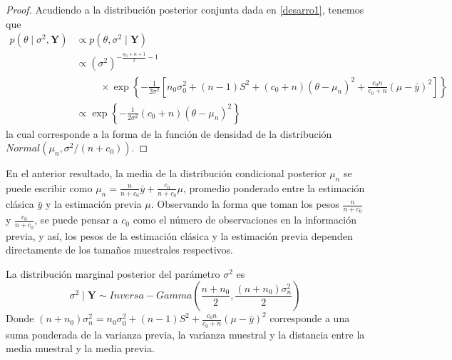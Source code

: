 \begin{proof}
Acudiendo a la distribución posterior conjunta dada en \ref{desarro1}, tenemos que
\begin{align*}
p(\theta \mid \sigma^2,\mathbf{Y})&\propto 
p(\theta,\sigma^2 \mid \mathbf{Y}) \\
&\propto(\sigma^2)^{-\frac{n_0+n+1}{2}-1}\\
&\hspace{1cm}\times
\exp\left\{-\frac{1}{2\sigma^2}\left[n_0\sigma^2_0+(n-1)S^2+(c_0+n)(\theta-\mu_n)^2+\frac{c_0n}{c_0+n}(\mu-\bar{y})^2\right]\right\}\\
&\propto \exp\left\{-\frac{1}{2\sigma^2}(c_0+n)(\theta-\mu_n)^2\right\}
\end{align*}
la cual corresponde a la forma de la función de densidad de la distribución $Normal(\mu_n, \sigma^2/(n+c_0))$.
\end{proof}

En el anterior resultado, la media de la distribución condicional posterior $\mu_n$ se puede escribir como $\mu_n=\frac{n}{n+c_0}\bar{y}+\frac{c_0}{n+c_0}\mu$, promedio ponderado entre la estimación clásica $\bar{y}$ y la estimación previa $\mu$. Observando la forma que toman los pesos $\frac{n}{n+c_0}$ y $\frac{c_0}{n+c_0}$, se puede pensar a $c_0$ como el número de observaciones en la información previa, y así, los pesos de la estimación clásica y la estimación previa dependen directamente de los tamaños muestrales respectivos.

\begin{Res}\label{Poster_sigma2_IG}
La distribución marginal posterior del parámetro $\sigma^2$ es
\begin{equation*}
\sigma^2 \mid \mathbf{Y} \sim Inversa-Gamma\left(\frac{n+n_0}{2},\frac{(n+n_0)\sigma^2_n}{2}\right)
\end{equation*}
Donde $(n+n_0)\sigma^2_n=n_0\sigma^2_0+(n-1)S^2+\frac{c_0n}{c_0+n}(\mu-\bar{y})^2$ corresponde a una suma ponderada de la varianza previa, la varianza muestral y la distancia entre la media muestral y la media previa.
\end{Res}

